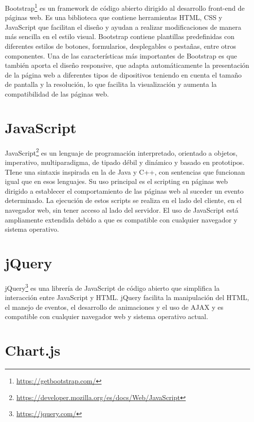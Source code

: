 \documentclass[a4paper, 12pt]{book}
\begin{document}
Bootstrap\footnote{\url{https://getbootstrap.com/}} es un framework de código abierto dirigido al desarrollo front-end de páginas web. Es una biblioteca que contiene herramientas HTML, CSS y JavaScript que facilitan el diseño y ayudan a realizar modificaciones de manera más sencilla en el estilo visual. Bootstrap contiene plantillas predefinidas con diferentes estilos de botones, formularios, desplegables o pestañas, entre otros componentes. Una de las características más importantes de Bootstrap es que también aporta el diseño responsive, que adapta automáticamente la presentación de la página web a diferentes tipos de dipositivos teniendo en cuenta el tamaño de pantalla y la resolución, lo que facilita la visualización y aumenta la compatibilidad de las páginas web.

\section{JavaScript} 
\label{sec:javascript}

JavaScript\footnote{\url{https://developer.mozilla.org/es/docs/Web/JavaScript}} es un lenguaje de programación interpretado, orientado a objetos, imperativo, multiparadigma, de tipado débil y dinámico y basado en prototipos. TIene una sintaxis inspirada en la de Java y C++, con sentencias que funcionan igual que en esos lenguajes.
Su uso principal es el scripting en páginas web dirigido a establecer el comportamiento de las páginas web al suceder un evento determinado. La ejecución de estos scripts se realiza en el lado del cliente, en el navegador web, sin tener acceso al lado del servidor.
El uso de JavaScript está ampliamente extendida debido a que es compatible con cualquier navegador y sistema operativo.

\section{jQuery} 
\label{sec:jquery}

jQuery\footnote{\url{https://jquery.com/}} es una librería de JavaScript de código abierto que simplifica la interacción entre JavaScript y HTML. jQuery facilita la manipulación del HTML, el manejo de eventos, el desarrollo de animaciones y el uso de AJAX y es compatible con cualquier navegador web y sistema operativo actual.

\section{Chart.js} 
\label{sec:chartjs}
\end{document}
